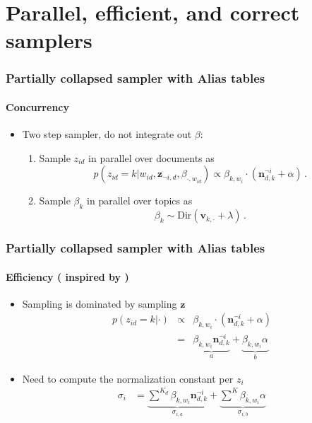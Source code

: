 \documentclass[compress]{beamer}
\begin{document}
\section{Parallel, efficient, and correct samplers}


\begin{frame}
\frametitle{Partially collapsed sampler with Alias tables}
\framesubtitle{Concurrency \cite{magnusson2017sparse}}


\begin{itemize}
\item Two step sampler, do not integrate out $\beta$:
\begin{enumerate}
    \item Sample $z_{id}$ in parallel over documents as
    \[
    p(z_{id}=k|w_{id},\mathbf{z}_{\lnot i,d},\beta_{\cdot,w_{id}})\propto\beta_{k,w_i}\cdot{(\mathbf{n}^{\lnot i}_{d,k}+\alpha)}\,.
    \]
    \item Sample $\beta_{k}$ in parallel over topics as
\[
\beta_k \sim \text{Dir}(\mathbf{v}_{k,\cdot}+\lambda)\,.
\]
\end{enumerate}
\end{itemize}

\end{frame}

\begin{frame}
\frametitle{Partially collapsed sampler with Alias tables}
\framesubtitle{Efficiency (\cite{magnusson2017sparse} inspired by \cite{li2014reducing})}

\begin{itemize}
\item Sampling is dominated by sampling $\mathbf{z}$
\begin{eqnarray*}
p(z_{id}=k|\cdot) & \propto & \beta_{k,w_{i}}\cdot\left(\mathbf{n}^{\lnot i}_{d,k}+\alpha\right)\\
 & = & \underbrace{\beta_{k,w_{i}}\mathbf{n}^{\lnot i}_{d,k}}_{a}+\underbrace{\beta_{k,w_{i}}\alpha}_{b}
\end{eqnarray*}

\item Need to compute the normalization constant per $z_i$
\begin{eqnarray*}
\sigma_i & = \underbrace{\sum^{K_{d}}\beta_{k,w_{i}}\mathbf{n}^{\lnot i}_{d,k}}_{\sigma_{i,a}} +  \underbrace{\sum^{K}\beta_{k,w_{i}}\alpha}_{\sigma_{i,b}}
\end{eqnarray*}

\end{itemize}

\end{frame}
\end{document}
